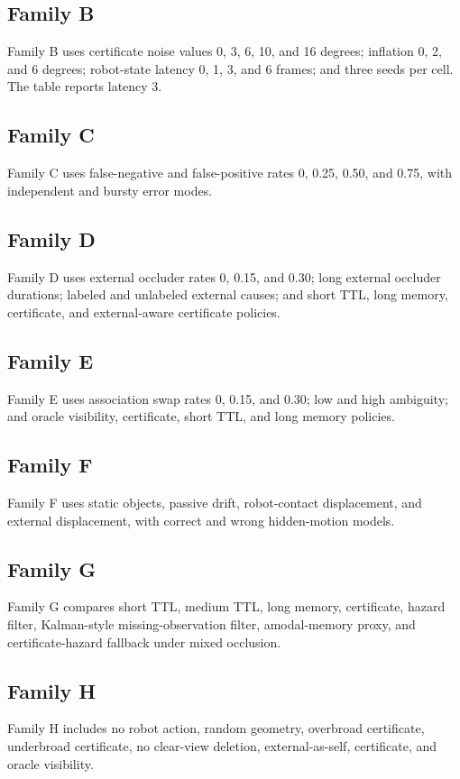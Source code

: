 \documentclass{article}
\begin{document}
\subsection{Family B}
Family B uses certificate noise values 0, 3, 6, 10, and 16 degrees; inflation
0, 2, and 6 degrees; robot-state latency 0, 1, 3, and 6 frames; and three seeds
per cell. The table reports latency 3.

\subsection{Family C}
Family C uses false-negative and false-positive rates 0, 0.25, 0.50, and 0.75,
with independent and bursty error modes.

\subsection{Family D}
Family D uses external occluder rates 0, 0.15, and 0.30; long external
occluder durations; labeled and unlabeled external causes; and short TTL, long
memory, certificate, and external-aware certificate policies.

\subsection{Family E}
Family E uses association swap rates 0, 0.15, and 0.30; low and high ambiguity;
and oracle visibility, certificate, short TTL, and long memory policies.

\subsection{Family F}
Family F uses static objects, passive drift, robot-contact displacement, and
external displacement, with correct and wrong hidden-motion models.

\subsection{Family G}
Family G compares short TTL, medium TTL, long memory, certificate, hazard
filter, Kalman-style missing-observation filter, amodal-memory proxy, and
certificate-hazard fallback under mixed occlusion.

\subsection{Family H}
Family H includes no robot action, random geometry, overbroad certificate,
underbroad certificate, no clear-view deletion, external-as-self, certificate,
and oracle visibility.
\end{document}
